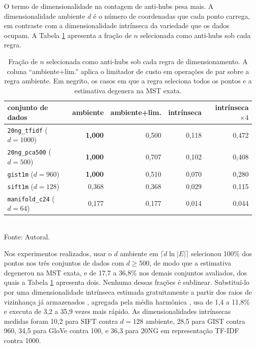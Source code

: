O termo de dimensionalidade na contagem de anti-hubs pesa mais. A dimensionalidade ambiente $d$ é o número de coordenadas que cada ponto carrega, em contraste com a dimensionalidade intrínseca da variedade que os dados ocupam. A Tabela \ref{tab:budget-fraction} apresenta a fração de $n$ selecionada como anti-hubs sob cada regra.\\

\begin{table}[htb!]
\caption{\label{tab:budget-fraction} Fração de $n$ selecionada como anti-hubs sob cada regra de dimensionamento. A coluna ``ambiente+lim.'' aplica o limitador de custo em operações de par sobre a regra ambiente. Em negrito, os casos em que a regra seleciona todos os pontos e a estimativa degenera na \ac{MST} exata.}
\centering
\footnotesize
\begin{tabular}{@{}lrrrr@{}}
\toprule
conjunto de dados & ambiente & ambiente+lim. & intrínseca & intrínseca $\times 4$ \\
\midrule
\texttt{20ng\_tfidf} ($d=1000$)  & \textbf{1,000} & 0,500 & 0,118 & 0,472 \\
\texttt{20ng\_pca500} ($d=500$)  & \textbf{1,000} & 0,707 & 0,102 & 0,408 \\
\texttt{gist1m} ($d=960$)        & \textbf{1,000} & 0,510 & 0,070 & 0,280 \\
\texttt{sift1m} ($d=128$)        & 0,368 & 0,368 & 0,029 & 0,115 \\
\texttt{manifold\_c24} ($d=64$)  & 0,177 & 0,177 & 0,014 & 0,044 \\
\bottomrule
\end{tabular}\\
Fonte: Autoral.
\end{table}

Nos experimentos realizados, usar o $d$ ambiente em $\lceil d \ln|E| \rceil$ selecionou 100\% dos pontos nos três conjuntos de dados com $d \geq 500$, de modo que a estimativa degenerou na \ac{MST} exata, e de 17,7 a 36,8\% nos demais conjuntos avaliados, dos quais a Tabela \ref{tab:budget-fraction} apresenta dois. Nenhuma dessas frações é sublinear. Substituí-lo por uma dimensionalidade intrínseca estimada gratuitamente a partir dos raios de vizinhança já armazenados \cite{levina_bickel}, agregada pela média harmônica \cite{mackay_ghahramani}, usa de 1,4 a 11,8\% e executa de 3,2 a 35,9 vezes mais rápido. As dimensionalidades intrínsecas medidas foram 10,2 para SIFT contra $d = 128$ ambiente, 28,5 para GIST contra 960, 34,5 para GloVe contra 100, e 36,3 para 20NG em representação TF-IDF contra 1000.\\

